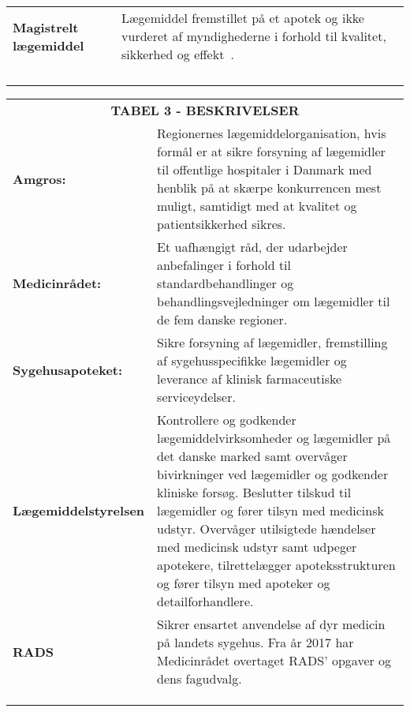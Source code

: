 \begin{table}[H]
\begin{tabular}{p{4.5cm} p{9.8cm}}
\textbf{Magistrelt lægemiddel} & Lægemiddel fremstillet på et apotek og ikke vurderet af myndighederne i forhold til kvalitet, sikkerhed og effekt~\citep{Laegemiddelinformaion2017}. \vspace{0.5cm} \\
& \vspace{0.5cm} \\
& \vspace{0.5cm} \\
& \vspace{0.5cm} \\
& \vspace{0.5cm} \\
\end{tabular}
\end{table}


\begin{table}[H]
\label{table:beskrivelser}
\vspace{0.5cm}
\begin{tabular}{p{4.5cm} p{9.8cm}}
\multicolumn{2}{c}{\cellcolor[HTML]{C0C0C0}\textbf{TABEL 3 - BESKRIVELSER}} \vspace{0.5cm} \\
\textbf{Amgros:} & Regionernes lægemiddelorganisation, hvis formål er at sikre forsyning af lægemidler til offentlige hospitaler i Danmark med henblik på at skærpe konkurrencen mest muligt, samtidigt med at kvalitet og patientsikkerhed sikres. \vspace{0.5cm}
\\ 
\textbf{Medicinrådet:} & Et uafhængigt råd, der udarbejder anbefalinger i forhold til standardbehandlinger og behandlingsvejledninger om lægemidler til de fem danske regioner. \vspace{0.5cm} \\
\textbf{Sygehusapoteket:} & Sikre forsyning af lægemidler,
fremstilling af sygehusspecifikke lægemidler og leverance af klinisk farmaceutiske serviceydelser. \vspace{0.5cm} \\
\textbf{Lægemiddelstyrelsen} & Kontrollere og godkender lægemiddelvirksomheder og lægemidler på det danske marked samt overvåger bivirkninger ved lægemidler og godkender kliniske forsøg. Beslutter tilskud til lægemidler og fører tilsyn med medicinsk udstyr. Overvåger utilsigtede hændelser med medicinsk udstyr samt udpeger apotekere, tilrettelægger apoteksstrukturen og fører tilsyn med apoteker og detailforhandlere.\vspace{0.5cm} \\
\textbf{RADS} & Sikrer ensartet anvendelse af dyr medicin på landets sygehus. Fra år 2017 har Medicinrådet overtaget RADS' opgaver og dens fagudvalg. \vspace{0.5cm} \\
& \vspace{0.5cm} \\
& \vspace{0.5cm} \\
& \vspace{0.5cm} \\
\end{tabular}
\end{table}




